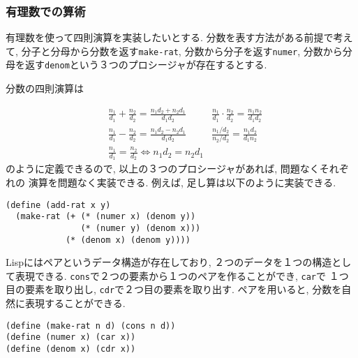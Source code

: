 \subsubsection{有理数での算術}
有理数を使って四則演算を実装したいとする. 分数を表す方法がある前提で考えて,
分子と分母から分数を返す\lstinline{make-rat}, 分数から分子を返す\lstinline{numer},
分数から分母を返す\lstinline{denom}という３つのプロシージャが存在するとする.

分数の四則演算は

\begin{align*}
  &\frac{n_1}{d_1} + \frac{n_2}{d_2}  = \frac{n_1d_2 + n_2d_1}{d_1d_2}
  & \frac{n_1}{d_1}\cdot \frac{n_2}{d_2} = \frac{n_1n_2}{d_1d_2}\\
  &\frac{n_1}{d_1} - \frac{n_2}{d_2} = \frac{n_1d_2 - n_2d_1}{d_1d_2}
  & \frac{n_1/d_2}{n_2/d_2} = \frac{n_1d_2}{d_1n_2}\\
  &\frac{n_1}{d_1} = \frac{n_2}{d_2} \Leftrightarrow n_1d_2 = n_2d_1
\end{align*}
\noindent
のように定義できるので, 以上の３つのプロシージャがあれば, 問題なくそれぞれの
演算を問題なく実装できる. 例えば, 足し算は以下のように実装できる.

\begin{lstlisting}[basicstyle=\footnotesize,title=分数の足し算]
(define (add-rat x y)
  (make-rat (+ (* (numer x) (denom y))
               (* (numer y) (denom x)))
            (* (denom x) (denom y))))
\end{lstlisting}
\vspace{5mm}

Lispにはペアというデータ構造が存在しており, ２つのデータを１つの構造として表現できる.
\lstinline{cons}で２つの要素から１つのペアを作ることができ, \lstinline{car}で
１つ目の要素を取り出し, \lstinline{cdr}で２つ目の要素を取り出す.
ペアを用いると, 分数を自然に表現することができる.

\begin{lstlisting}[basicstyle=\footnotesize,title=分数の表現]
(define (make-rat n d) (cons n d))
(define (numer x) (car x))
(define (denom x) (cdr x))
\end{lstlisting}
